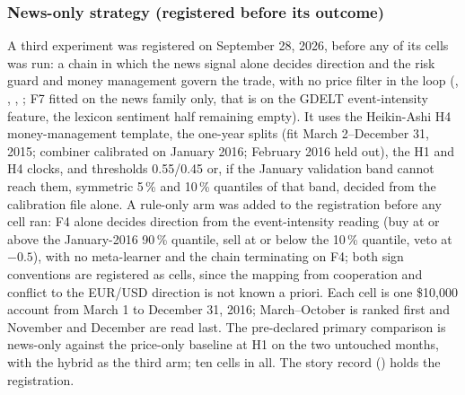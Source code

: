 \subsubsection{News-only strategy (registered before its outcome)} \label{subsec:news-only}

A third experiment was registered on September 28, 2026, before any of its cells was run: a chain in which the news signal alone decides direction and the risk guard and money management govern the trade, with no price filter in the loop (, , , ; F7 fitted on the news family only, that is on the GDELT event-intensity feature, the lexicon sentiment half remaining empty). It uses the Heikin-Ashi H4 money-management template, the one-year splits (fit March 2--December 31, 2015; combiner calibrated on January 2016; February 2016 held out), the H1 and H4 clocks, and thresholds 0.55/0.45 or, if the January validation band cannot reach them, symmetric 5\,\% and 10\,\% quantiles of that band, decided from the calibration file alone. A rule-only arm was added to the registration before any cell ran: F4 alone decides direction from the event-intensity reading (buy at or above the January-2016 90\,\% quantile, sell at or below the 10\,\% quantile, veto at $-0.5$), with no meta-learner and the chain terminating on F4; both sign conventions are registered as cells, since the mapping from cooperation and conflict to the EUR/USD direction is not known a priori. Each cell is one \$10,000 account from March 1 to December 31, 2016; March--October is ranked first and November and December are read last. The pre-declared primary comparison is news-only against the price-only baseline at H1 on the two untouched months, with the hybrid as the third arm; ten cells in all. The story record () holds the registration.

